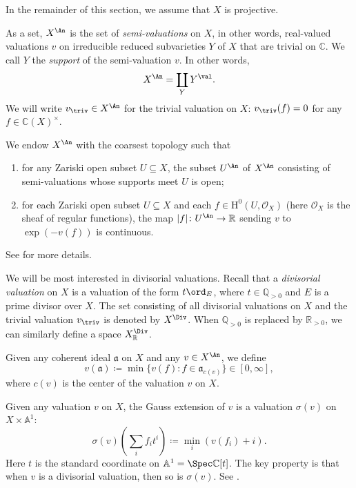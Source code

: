 In the remainder of this section, we assume that $X$ is projective.

As a set, $X^{\An}$ is the set of \emph{semi-valuations} on $X$, in other words, real-valued valuations $v$ on irreducible reduced subvarieties $Y$ of $X$ that are trivial on $\mathbb{C}$. We call $Y$ the \emph{support} of the semi-valuation $v$.
In other words,
\[
X^{\An}=\coprod_{Y} Y^{\val}.
\]
We will write $v_{\triv}\in X^{\An}$ for the trivial valuation on $X$: $v_{\triv}(f)=0$ for any $f\in \mathbb{C}(X)^{\times}$.

We endow $X^{\An}$ with the coarsest topology such that
\begin{enumerate}
    \item\label{itm:chapter-NApotential:L902:1} for any Zariski open subset $U\subseteq X$, the subset $U^{\An}$ of $X^{\An}$ consisting of semi-valuations whose supports meet $U$ is open;
    \item\label{itm:chapter-NApotential:L902:2} for each Zariski open subset $U\subseteq X$ and each $f\in \mathrm{H}^0(U,\mathcal{O}_X)$ (here $\mathcal{O}_X$ is the sheaf of regular functions), the map $|f|\colon U^{\An}\rightarrow \mathbb{R}$ sending $v$ to $\exp(-v(f))$ is continuous.
\end{enumerate}
See \cite{Berk93} for more details.

We will be most interested in divisorial valuations. Recall that a \emph{divisorial valuation} on $X$ is a valuation of the form $t\ord_E$, where $t\in \mathbb{Q}_{>0}$ and $E$ is a prime divisor over $X$. The set consisting of all divisorial valuations on $X$ and the trivial valuation $v_{\triv}$ is denoted by $X^{\Div}$. When $\mathbb{Q}_{>0}$ is replaced by $\mathbb{R}_{>0}$, we can similarly define a space $X^{\Div}_{\mathbb{R}}$.

Given any coherent ideal $\mathfrak{a}$ on $X$ and any $v\in X^{\An}$, we define
\begin{equation}\label{eq:va}
v(\mathfrak{a})\coloneqq\min\{v(f):f\in \mathfrak{a}_{c(v)}\}\in [0,\infty],
\end{equation}
where $c(v)$ is the center of the valuation $v$ on $X$.

Given any valuation $v$ on $X$, the Gauss extension of $v$ is a valuation $\sigma(v)$ on $X\times \mathbb{A}^1$:
\begin{equation}\label{eq:Gext}
\sigma(v)\left(\sum_i f_i t^i\right)\coloneqq\min_i (v(f_i)+i).
\end{equation}
Here $t$ is the standard coordinate on $\mathbb{A}^1=\Spec \mathbb{C}[t]$. The key property is that when $v$ is a divisorial valuation, then so is $\sigma(v)$. See \cite[Lemma~4.2]{BHJ17}.


